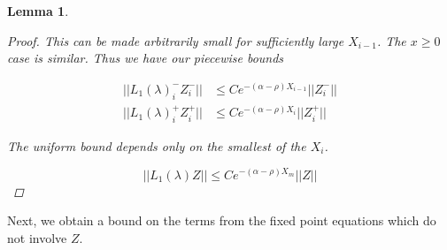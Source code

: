 \documentclass[12pt]{article}
\newtheorem{lemma}{Lemma}
\begin{document}
\begin{lemma}
\begin{proof}
This can be made arbitrarily small for sufficiently large $X_{i-1}$. The $x \geq 0$ case is similar. Thus we have our piecewise bounds

\begin{align*}
||L_1(\lambda)_i^- Z_i^-|| &\leq C e^{-(\alpha - \rho)X_{i-1}} ||Z_i^-|| \\
||L_1(\lambda)_i^+ Z_i^+|| &\leq C e^{-(\alpha - \rho)X_i} ||Z_i^+||
\end{align*}

The uniform bound depends only on the smallest of the $X_i$.

\[
||L_1(\lambda)Z|| \leq C e^{-(\alpha - \rho)X_m}||Z||
\]

\end{proof}
\end{lemma}

Next, we obtain a bound on the terms from the fixed point equations which do not involve $Z$. 

\end{document}
